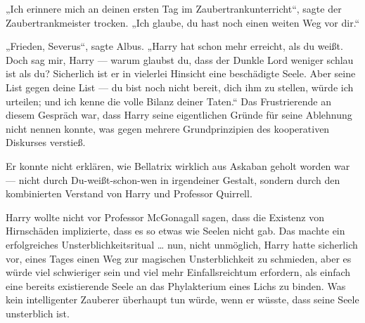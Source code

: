 „Ich erinnere mich an deinen ersten Tag im Zaubertrankunterricht“, sagte der Zaubertrankmeister trocken.
„Ich glaube, du hast noch einen weiten Weg vor dir.“

„Frieden, Severus“, sagte Albus.
„Harry hat schon mehr erreicht, als du weißt. Doch sag mir, Harry — warum glaubst du, dass der Dunkle Lord weniger schlau ist als du? Sicherlich ist er in vielerlei Hinsicht eine beschädigte Seele. Aber seine List gegen deine List — du bist noch nicht bereit, dich ihm zu stellen, würde ich urteilen; und ich kenne die volle Bilanz deiner Taten.“ \later Das Frustrierende an diesem Gespräch war, dass Harry seine eigentlichen Gründe für seine Ablehnung nicht nennen konnte, was gegen mehrere Grundprinzipien des kooperativen Diskurses verstieß.

Er konnte nicht erklären, wie Bellatrix wirklich aus Askaban geholt worden war — nicht durch Du-weißt-schon-wen in irgendeiner Gestalt, sondern durch den kombinierten Verstand von Harry und Professor Quirrell.

Harry wollte nicht vor Professor McGonagall sagen, dass die Existenz von Hirnschäden implizierte, dass es so etwas wie Seelen nicht gab. Das machte ein erfolgreiches Unsterblichkeitsritual … nun, nicht unmöglich, Harry hatte sicherlich vor, eines Tages einen Weg zur magischen Unsterblichkeit zu schmieden, aber es würde viel schwieriger sein und viel mehr Einfallsreichtum erfordern, als einfach eine bereits existierende Seele an das Phylakterium eines Lichs zu binden. Was kein intelligenter Zauberer überhaupt tun würde, wenn er wüsste, dass seine Seele unsterblich ist.

